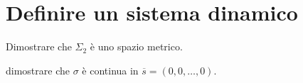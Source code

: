 \section{Definire un sistema dinamico}%
\label{sub:Definire un sistema dinamico}
\begin{ex}
    Dimostrare che $\Sigma_2$ è uno spazio metrico.
\end{ex}
\noindent
\begin{ex}
    dimostrare che $\sigma$ è continua in $\overline{s}=(0, 0, \ldots, 0)$.
\end{ex}
\noindent

